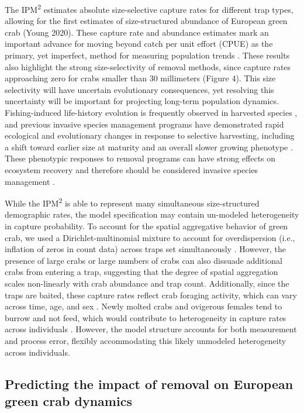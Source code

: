 \documentclass{article}
\begin{document}
The IPM\textsuperscript{2} estimates absolute size-selective capture rates for different trap types, allowing for the first estimates of size-structured abundance of European green crab (Young 2020). These capture rate and abundance estimates mark an important advance for moving beyond catch per unit effort (CPUE) as the primary, yet imperfect, method for measuring population trends \parencite{harley2001catch}. These results also highlight the strong size-selectivity of removal methods, since capture rates approaching zero for crabs smaller than 30 millimeters (Figure 4). This size selectivity will have uncertain evolutionary consequences, yet resolving this uncertainty will be important for projecting long-term population dynamics. Fishing-induced life-history evolution is frequently observed in harvested species \parencite{enberg2012fishing}, and previous invasive species management programs have demonstrated rapid ecological and evolutionary changes in response to selective harvesting, including a shift toward earlier size at maturity and an overall slower growing phenotype \parencite{evangelista2015impacts}. These phenotypic responses to removal programs can have strong effects on ecosystem recovery and therefore should be considered invasive species management \parencite{zavorka2020phenotypic}.

While the IPM\textsuperscript{2} is able to represent many simultaneous size-structured demographic rates, the model specification may contain un-modeled heterogeneity in capture probability. To account for the spatial aggregative behavior of green crab, we used a Dirichlet-multinomial mixture to account for overdispersion (i.e., inflation of zeros in count data) across traps set simultaneously \parencite{thorson2017model, young2019life}. However, the presence of large crabs or large numbers of crabs can also dissuade additional crabs from entering a trap, suggesting that the degree of spatial aggregation scales non-linearly with crab abundance and trap count. Additionally, since the traps are baited, these capture rates reflect crab foraging activity, which can vary across time, age, and sex \parencite{young2019life}. Newly molted crabs and ovigerous females tend to burrow and not feed, which would contribute to heterogeneity in capture rates across individuals \parencite{ropes1968feeding}. However, the model structure accounts for both measurement and process error, flexibly accommodating this likely unmodeled heterogeneity across individuals.  

\subsection{Predicting the impact of removal on European green crab dynamics}
\end{document}
